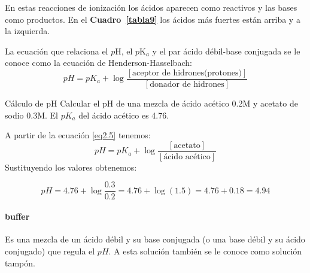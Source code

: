  En estas reacciones de ionizaci\'on los \'acidos aparecen como reactivos y las bases como productos.
 En el \textbf{Cuadro~\ref{tabla9}} los \'acidos m\'as fuertes est\'an arriba y a la izquierda.

La ecuaci\'on que relaciona el $p$H, el $p$K$_a$  y el par
\'acido d\'ebil-base conjugada se le conoce como la ecuaci\'on de
Henderson-Hasselbach:
\begin{equation}
pH = pK_a + \log
\frac{[\textrm{aceptor de hidrones(protones)}]}
{[\textrm{donador de hidrones}]}
\label{eq2.5}
\end{equation}

\begin{ejemplo}{C\'alculo de pH}
 Calcular el pH de una mezcla de \'acido ac\'etico 0.2M y acetato de sodio 0.3M. El $pK_a$ del \'acido ac\'etico es 4.76.

A partir de la ecuaci\'on \ref{eq2.5} tenemos:
$$ pH = pK_a + \log \frac{[\textrm{acetato}]}{{[\textrm{
\'acido ac\'etico}]}}$$ Sustituyendo los valores obtenemos:

$$pH = 4.76 + \log \frac{0.3}{0.2} = 4.76 + \log(1.5) = 4.76 +
0.18=4.94$$
\end{ejemplo}

\paragraph{\gls{buffer}}Es una mezcla de un \'acido d\'ebil y su base conjugada (o una base d\'e\-bil y su \'acido conjugado) que regula el $pH$. A esta soluci\'on tambi\'en se le conoce como soluci\'on tamp\'on.


\label{sec:ejercicios_cap03}
